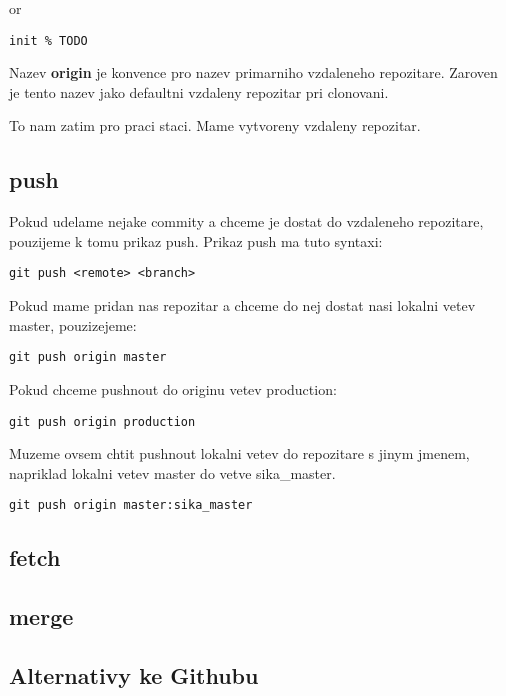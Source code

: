 or

\begin{lstlisting}
init % TODO
\end{lstlisting}

Nazev {\bf origin} je konvence pro nazev primarniho vzdaleneho repozitare. Zaroven je tento nazev jako defaultni vzdaleny repozitar pri clonovani.

To nam zatim pro praci staci. Mame vytvoreny vzdaleny repozitar.

\subsection{push}

Pokud udelame nejake commity a chceme je dostat do vzdaleneho repozitare, pouzijeme k tomu prikaz push. Prikaz push ma tuto syntaxi:

\begin{lstlisting}
git push <remote> <branch>
\end{lstlisting}

Pokud mame pridan nas repozitar a chceme do nej dostat nasi lokalni vetev master, pouzizejeme:

\begin{lstlisting}
git push origin master
\end{lstlisting}

Pokud chceme pushnout do originu vetev production:

\begin{lstlisting}
git push origin production
\end{lstlisting}

Muzeme ovsem chtit pushnout lokalni vetev do repozitare s jinym jmenem, napriklad lokalni vetev master do vetve sika\_master.

\begin{lstlisting}
git push origin master:sika_master
\end{lstlisting}

\subsection{fetch}
\subsection{merge}

\subsection{Alternativy ke Githubu}

